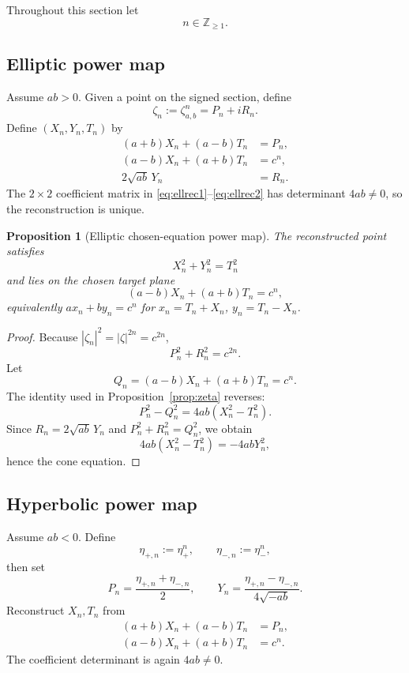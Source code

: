 \documentclass[11pt]{amsart}
\newtheorem{proposition}[theorem]{Proposition}
\theoremstyle{remark}
\begin{document}
Throughout this section let
\[
n\in\mathbb Z_{\ge1}.
\]

\subsection{Elliptic power map}
Assume $ab>0$.  Given a point on the signed section, define
\[
\zeta_n:=\zeta_{a,b}^n=P_n+iR_n.
\]
Define $(X_n,Y_n,T_n)$ by
\begin{align}
(a+b)X_n+(a-b)T_n&=P_n,\label{eq:ellrec1}\\
(a-b)X_n+(a+b)T_n&=c^n,\label{eq:ellrec2}\\
2\sqrt{ab}\,Y_n&=R_n.\label{eq:ellrec3}
\end{align}
The $2\times2$ coefficient matrix in \eqref{eq:ellrec1}--\eqref{eq:ellrec2} has determinant $4ab\ne0$, so the reconstruction is unique.

\begin{proposition}[Elliptic chosen-equation power map]\label{prop:ellpower}
The reconstructed point satisfies
\[
X_n^2+Y_n^2=T_n^2
\]
and lies on the chosen target plane
\[
(a-b)X_n+(a+b)T_n=c^n,
\]
equivalently $ax_n+by_n=c^n$ for $x_n=T_n+X_n$, $y_n=T_n-X_n$.
\end{proposition}

\begin{proof}
Because $|\zeta_n|^2=|\zeta|^{2n}=c^{2n}$,
\[
P_n^2+R_n^2=c^{2n}.
\]
Let
\[
Q_n=(a-b)X_n+(a+b)T_n=c^n.
\]
The identity used in Proposition~\ref{prop:zeta} reverses:
\[
P_n^2-Q_n^2=4ab(X_n^2-T_n^2).
\]
Since $R_n=2\sqrt{ab}\,Y_n$ and $P_n^2+R_n^2=Q_n^2$, we obtain
\[
4ab(X_n^2-T_n^2)=-4abY_n^2,
\]
hence the cone equation.
\end{proof}

\subsection{Hyperbolic power map}
Assume $ab<0$.  Define
\[
\eta_{+,n}:=\eta_+^n,
\qquad
\eta_{-,n}:=\eta_-^n,
\]
then set
\begin{equation}\label{eq:hyperPQ}
P_n=\frac{\eta_{+,n}+\eta_{-,n}}{2},
\qquad
Y_n=\frac{\eta_{+,n}-\eta_{-,n}}{4\sqrt{-ab}}.
\end{equation}
Reconstruct $X_n,T_n$ from
\begin{align}
(a+b)X_n+(a-b)T_n&=P_n,\label{eq:hyprec1}\\
(a-b)X_n+(a+b)T_n&=c^n.\label{eq:hyprec2}
\end{align}
The coefficient determinant is again $4ab\ne0$.
\end{document}
